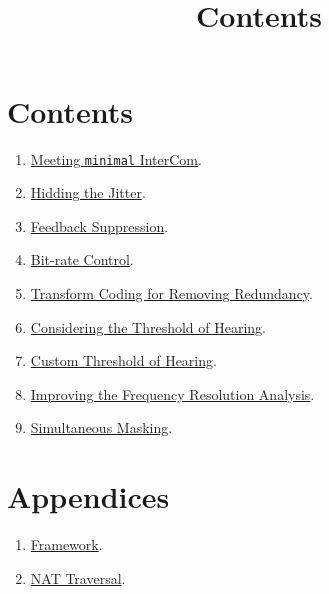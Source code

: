 

\title{\TM{}\\Contents}

\maketitle

\section*{Contents}

\begin{enumerate}
\item \href{https://tecnologias-multimedia.github.io/contents/minimal/}{Meeting \texttt{minimal} InterCom}.
\item \href{https://tecnologias-multimedia.github.io/contents/jitter/}{Hidding the Jitter}.
\item \href{https://tecnologias-multimedia.github.io/contents/feedback_suppression/}{Feedback Suppression}.
\item \href{https://tecnologias-multimedia.github.io/contents/BR_control/}{Bit-rate Control}.
\item \href{https://tecnologias-multimedia.github.io/contents/transform_coding/}{Transform Coding for Removing Redundancy}.
\item \href{https://tecnologias-multimedia.github.io/contents/threshold_of_hearing/}{Considering the Threshold of Hearing}.
\item \href{https://tecnologias-multimedia.github.io/contents/custom_ToH/}{Custom Threshold of Hearing}.
\item \href{https://tecnologias-multimedia.github.io/contents/higher_subband_resolution/}{Improving the Frequency Resolution Analysis}.
\item \href{https://tecnologias-multimedia.github.io/contents/simultaneous_masking/}{Simultaneous Masking}.
\end{enumerate}

\section*{Appendices}
\begin{enumerate}
\item \href{https://tecnologias-multimedia.github.io/contents/framework/}{Framework}.
\item \href{https://tecnologias-multimedia.github.io/contents/NAT_traversal/}{NAT Traversal}.
\end{enumerate}


%
